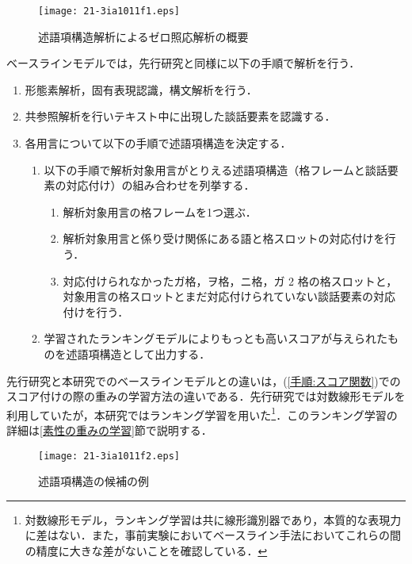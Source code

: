 \documentclass[japanese]{jnlp_1.4}
\begin{document}
\begin{figure}[t]
\texttt{[image: 21-3ia1011f1.eps]}
\caption{述語項構造解析によるゼロ照応解析の概要}
\label{述語項構造解析によるゼロ照応解析の概要}
\vspace{-6pt}
\end{figure}


ベースラインモデルでは，先行研究\cite{sasano-kurohashi:2011:IJCNLP-2011}と同様に以下の手順で解析を行う．
\begin{enumerate}
 \item 形態素解析，固有表現認識，構文解析を行う．
 \item 共参照解析を行いテキスト中に出現した談話要素を認識する．\label{談話要素設定}
 \item 各用言について以下の手順で述語項構造を決定する．\label{述語項構造}
	   \begin{enumerate}
		\item 以下の手順で解析対象用言がとりえる述語項構造（格フレームと談話要素の対応付け）の組み合わせを列挙する．\label{述語項構造列挙}
			  \begin{enumerate}
			   \item 解析対象用言の格フレームを1つ選ぶ．\label{格フレーム選択}
\pagebreak
			   \item 解析対象用言と係り受け関係にある語と格スロットの対応付けを行う．\label{係り受け対応付け}
			   \item 対応付けられなかったガ格，ヲ格，ニ格，ガ 2 格の格スロットと，対象用言の格スロットとまだ対応付けられていない談話要素の対応付けを行う．\label{ゼロ照応}
			  \end{enumerate}
		\item 学習されたランキングモデルによりもっとも高いスコアが与えられたものを述語項構造として出力する．\label{手順:スコア関数}
	   \end{enumerate}
\end{enumerate}
先行研究と本研究でのベースラインモデルとの違いは，(\ref{手順:スコア関数})でのスコア付けの際の重みの学習方法の違いである．先行研究では対数線形モデルを利用していたが，本研究ではランキング学習を用いた\footnote{対数線形モデル，ランキング学習は共に線形識別器であり，本質的な表現力に差はない．また，事前実験においてベースライン手法においてこれらの間の精度に大きな差がないことを確認している．}．このランキング学習の詳細は\ref{素性の重みの学習}節で説明する．

\begin{figure}[b]
\texttt{[image: 21-3ia1011f2.eps]}
  \caption{述語項構造の候補の例}
\label{述語項構造の候補の例}
\end{figure}
\end{document}
